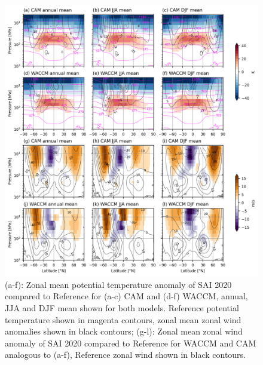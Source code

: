 \begin{figure}[H]
	\centering
	\includegraphics[width=0.95\linewidth]{images/th_U_full.png}
	\caption{(a-f): Zonal mean potential temperature anomaly of SAI 2020 compared to Reference for (a-c) CAM and (d-f) WACCM, annual, JJA and DJF mean shown for both models. Reference potential temperature shown in magenta contours, zonal mean zonal wind anomalies shown in black contours; (g-l): Zonal mean zonal wind anomaly of SAI 2020 compared to Reference for WACCM and CAM analogous to (a-f), Reference zonal wind shown in black contours.}
	\label{fig:th_U_full}
\end{figure}